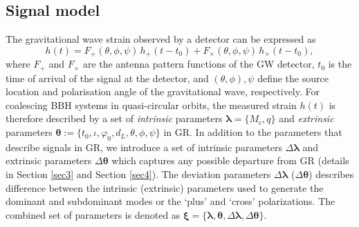 \documentclass[prd,preprintnumbers,twocolumn,eqsecnum,floatfix,a4paper,nofootinbib,superscriptaddress]{revtex4}
\newcommand{\blambda}{\bm{\lambda}}
\newcommand{\btheta}{\bm{\theta}}
\newcommand{\bxi}{\bm{\xi}}
\begin{document}
\subsection{Signal model}
The gravitational wave strain observed by a detector can be expressed as
\begin{equation}
h(t) = F_+(\theta, \phi, \psi) \, h_+(t-t_0) + F_{\times}(\theta, \phi, \psi)\, {h}_{\times}(t-t_0), 
\label{eq:det_response}
\end{equation}
where $F_+$ and $F_\times$ are the antenna pattern functions of the GW detector, $t_0$ is the time of arrival of the signal at the detector, and $(\theta, \phi), \psi$ define the source location and polarisation angle of the gravitational wave, respectively. For coalescing BBH systems in quasi-circular orbits, the measured strain $h(t)$ is therefore described by a set of \emph{intrinsic} parameters $\blambda = \{M_c, q\}$ and \emph{extrinsic} parameters  $\btheta := \{t_0, \iota, \varphi_0, d_L, \theta, \phi, \psi\}$ in GR. In addition to the parameters that describe signals in GR, we introduce a set of intrinsic parameters $\Delta \blambda$ and extrinsic parameters $\Delta \btheta$  which captures any possible departure from GR (details in Section \ref{sec3} and Section \ref{sec4}). The deviation parameters $\Delta \blambda$ ($\Delta \btheta$) describes difference between the intrinsic (extrinsic) parameters used to generate the dominant and subdominant modes or the `plus' and `cross' polarizations.  The combined set of parameters is denoted as $\bxi = \{\blambda, \btheta, \Delta \blambda, \Delta \btheta\}$. 
\end{document}
